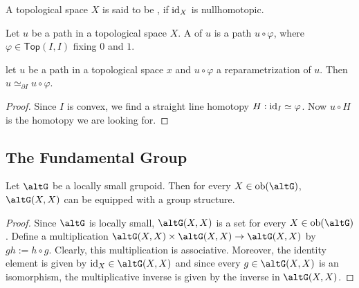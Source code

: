 \begin{definition}[Contractible]
	A topological space $X$ is said to be , if $\operatorname{id}_X$ is nullhomotopic.
\end{definition}

\begin{definition}[Reparametrization]
	Let $u$ be a path in a topological space $X$. A  of $u$ is a path $u \circ \varphi$, where $\varphi \in \mathsf{Top}(I,I)$ fixing $0$ and $1$.
\end{definition}

\begin{lemma}
	\label{lem:reparametrization_homotopy}
	let $u$ be a path in a topological space $x$ and $u \circ \varphi$ a reparametrization of $u$. Then $u \simeq_{\partial I} u \circ \varphi$.
\end{lemma}

\begin{proof}
	Since $I$ is convex, we find a straight line homotopy $H : \operatorname{id}_I \simeq \varphi$. Now $u \circ H$ is the homotopy we are looking for.
\end{proof}

\subsection*{The Fundamental Group}

\begin{lemma}
	Let $\mathcal{\altG}$ be a locally small grupoid. Then for every $X \in \ob(\mathcal{\altG})$, $\mathcal{\altG}(X,X)$ can be equipped with a group structure.
	\label{lem:groupoid_group}
\end{lemma}

\begin{proof}
	Since $\mathcal{\altG}$ is locally small, $\mathcal{\altG}(X,X)$ is a set for every $X \in \ob(\mathcal{\altG})$. Define a multiplication $\mathcal{\altG}(X,X) \times \mathcal{\altG}(X,X) \to \mathcal{\altG}(X,X)$ by $gh := h \circ g$. Clearly, this multiplication is associative. Moreover, the identity element is given by $\id_X \in \mathcal{\altG}(X,X)$ and since every $g \in \mathcal{\altG}(X,X)$ is an isomorphism, the multiplicative inverse is given by the inverse in $\mathcal{\altG}(X,X)$. 
\end{proof}

